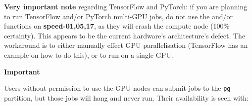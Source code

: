 \textbf{Very important note} regarding TensorFlow and PyTorch: 
if you are planning to run TensorFlow and/or PyTorch multi-GPU jobs, 
do not use the  and/or
functions on \textbf{speed-01,05,17}, as they will crash the compute node (100\% certainty). 
This appears to be the current hardware's architecture's defect.
%
The workaround is to either
manually effect GPU parallelisation (TensorFlow has an example on how to
do this), or to run on a single GPU.

\vspace{10pt}
\noindent
\textbf{Important}
\vspace{10pt}

Users without permission to use the GPU nodes can submit jobs to the \texttt{pg}
partition, but those jobs will hang and never run.
%
Their availability is seen with:
%


